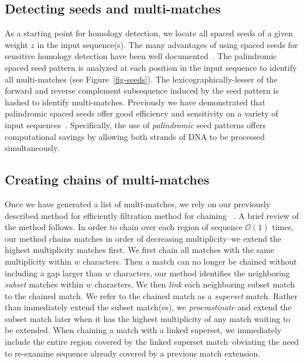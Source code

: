 \documentclass{ws-procs9x6}
\begin{document}

\subsection{Detecting seeds and multi-matches}

As a starting point for homology detection, we locate all spaced seeds of a given weight $z$ in the input sequence(s). The many advantages of using spaced seeds for sensitive homology detection have been well documented~\cite{ref-spacedseeds, ref-pattern}. The palindromic spaced seed pattern is analyzed at each position in the input sequence to identify all multi-matches (see Figure~\ref{fig-seeds}).   The lexicographically-lesser of the forward and reverse complement
subsequence induced by the seed pattern is hashed to identify multi-matches.  Previously we have demonstrated that palindromic spaced seeds offer good efficiency and sensitivity on a variety of input sequences~\cite{ref-procrast}. Specifically, the use of \textit{palindromic} seed patterns offers computational savings by allowing both strands of DNA to be processed simultaneously.

\subsection{Creating chains of multi-matches}

Once we have generated a list of multi-matches, we rely on our previously described method for efficiently filtration method for chaining ~\cite{ref-procrast}. A brief review of the method follows. In order to chain over each region of sequence $\mathcal{O}(1)$ times,
our method chains matches in order of decreasing multiplicity--we
extend the highest multiplicity matches first. We first chain all matches
with the same multiplicity within $w$
characters. Then a match can no
longer be chained without including a gap larger than $w$
characters, our method identifies the neighboring \textit{subset}
matches within $w$ characters. We then \textit{link} each
neighboring subset match to the chained match. We refer to the
chained match as a \textit{superset} match. Rather than immediately
extend the subset match(es), we \textit{procrastinate} and extend
the subset match later when it has the highest multiplicity of any
match waiting to be extended. When chaining a match with a linked
superset, we immediately include the entire region covered by the linked superset
match--obviating the need to re-examine sequence already covered by
a previous match extension.
\end{document}
